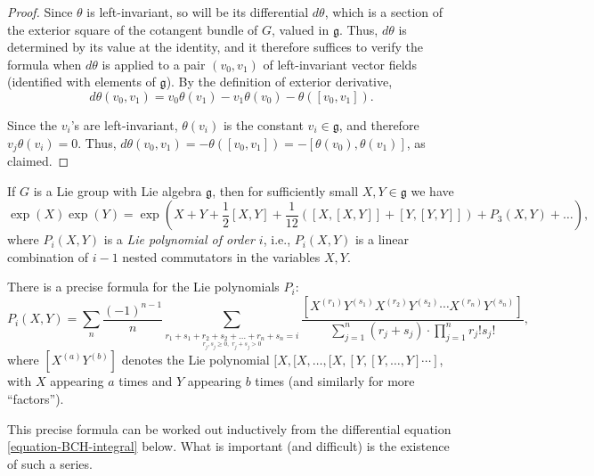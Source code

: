 \begin{proof}
 Since $\theta$ is left-invariant, so will be its differential $d\theta$, which is a section of the exterior square of the cotangent bundle of $G$, valued in $\mathfrak g$. Thus, $d\theta$ is determined by its value at the identity, and it therefore suffices to verify the formula when $d\theta$ is applied to a pair $(v_0,v_1)$ of left-invariant vector fields (identified with elements of $\mathfrak g$). By the definition of exterior derivative,
 $$ d\theta(v_0,v_1) = v_0 \theta(v_1) - v_1 \theta(v_0) - \theta([v_0,v_1]).$$
 
 Since the $v_i$'s are left-invariant, $\theta(v_i)$ is the constant $v_i\in \mathfrak g$, and therefore $v_j \theta(v_i)=0$. Thus, $d\theta(v_0,v_1) = - \theta([v_0,v_1]) = - [\theta(v_0), \theta(v_1)]$, as claimed.
\end{proof}



\begin{theorem} 
\label{theorem-Baker-Campbell-Hausdorff}
If $G$ is a Lie group with Lie algebra $\mathfrak g$, then for sufficiently small $X, Y\in \mathfrak g$ we have 
\begin{equation}
 \label{equation-BCH}
\exp(X) \exp(Y) = \exp(X+Y+ \frac{1}{2}[X,Y] + \frac{1}{12} ([X,[X,Y]]  + [Y, [Y,Y]]) + P_3 (X,Y) + \dots),
\end{equation}
where $P_i(X,Y)$ is a \emph{Lie polynomial of order $i$}, i.e., $P_i(X, Y)$ is a linear combination of $i-1$ nested commutators in the variables $X, Y$. 
\end{theorem}

\begin{remark}
\label{remark-BCH-formula}
There is a precise formula for the Lie polynomials $P_i$:
\begin{equation}
\label{equation-BCHterms}
P_i(X,Y) = \sum_n \frac{(-1)^{n-1}}{n} \sum_{\underset{r_j, s_j \ge 0, \,\, r_j+s_j>0}{r_1+s_1+ r_2+s_2+ \dots+ r_n+s_n = i}} \frac{[X^{(r_1)} Y^{(s_1)} X^{(r_2)} Y^{(s_2)} \cdots X^{(r_n)} Y^{(s_n)}]}{\sum_{j=1}^n (r_j+s_j) \cdot \prod_{j=1}^n r_j! s_j!},
\end{equation}
where $[X^{(a)} Y^{(b)}]$ denotes the Lie polynomial $[X, [X, \dots, [X, [Y,[Y,\dots, Y]\cdots]$, with $X$ appearing $a$ times and $Y$ appearing $b$ times (and similarly for more ``factors'').

This precise formula can be worked out inductively from the differential equation \eqref{equation-BCH-integral} below. What is important (and difficult) is the existence of such a series.
\end{remark}



